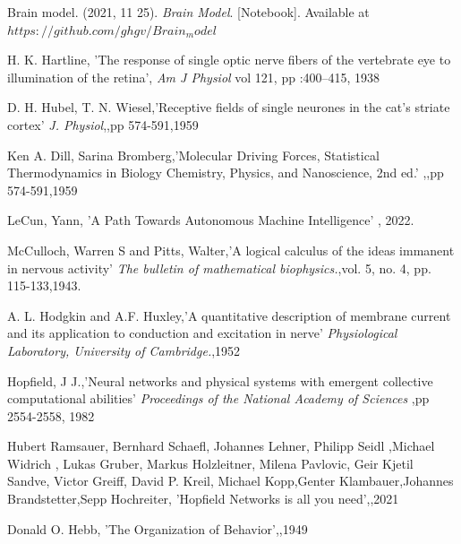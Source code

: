 \documentclass[journal]{IEEEtai}
\begin{document}
\begin{thebibliography}{34}
\setcounter{enumiv}{0}

 Brain model. (2021, 11 25). {\em Brain Model}. [Notebook]. Available at $https://github.com/ghgv/Brain_model$

 H. K. Hartline, 'The response of single optic nerve fibers of the vertebrate eye to illumination of the retina', {\em Am J Physiol} vol 121, pp :400–415, 1938

 D. H. Hubel, T. N. Wiesel,'Receptive fields of single neurones in the cat's striate cortex' {\em J. Physiol},,pp 574-591,1959

 Ken A. Dill, Sarina Bromberg,'Molecular Driving Forces, Statistical Thermodynamics in Biology Chemistry, Physics, and Nanoscience, 2nd ed.' {\em },,pp 574-591,1959

 LeCun, Yann, 'A Path Towards Autonomous Machine Intelligence'{\em} , 2022.



 McCulloch, Warren S and Pitts, Walter,'A logical calculus of the ideas immanent in nervous activity' {\em The bulletin of mathematical biophysics.},vol. 5, no. 4, pp. 115-133,1943.

 A. L. Hodgkin and A.F. Huxley,'A quantitative description of membrane current and its application to conduction and excitation in nerve' {\em Physiological Laboratory, University of Cambridge.},1952


 Hopfield, J J.,'Neural networks and physical systems with emergent collective computational abilities' {\em Proceedings of the National Academy of Sciences },pp 2554-2558, 1982

 Hubert Ramsauer, Bernhard Schaefl,              Johannes Lehner, Philipp Seidl ,Michael Widrich ,               Lukas Gruber, Markus Holzleitner, Milena Pavlovic,               Geir Kjetil Sandve, Victor Greiff, David P. Kreil,
Michael Kopp,Genter Klambauer,Johannes Brandstetter,Sepp Hochreiter, 'Hopfield Networks is all you need',{\em},2021
 
 Donald O. Hebb, 'The Organization of Behavior',{\em},1949


\end{thebibliography}
\end{document}
